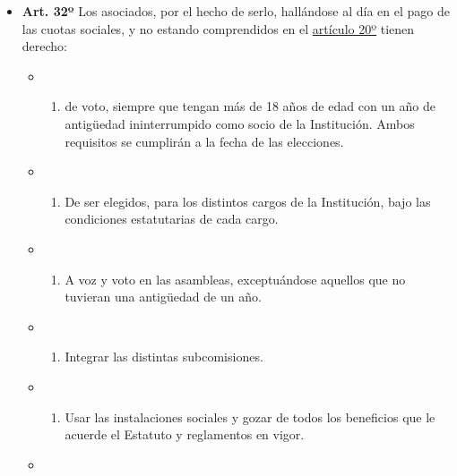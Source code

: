 \documentclass[]{book}
\providecommand{\tightlist}{%
  \setlength{\itemsep}{0pt}\setlength{\parskip}{0pt}}
\begin{document}
\begin{itemize}
\item
  \textbf{Art. 32º} Los asociados, por el hecho de serlo, hallándose al
  día en el pago de las cuotas sociales, y no estando comprendidos en el
  \protect\hyperlink{art20}{artículo 20º} tienen derecho:

  \begin{itemize}
  \item
    \begin{enumerate}
    \def\labelenumi{\alph{enumi})}
    \tightlist
    \item
      de voto, siempre que tengan más de 18 años de edad con un año de
      antigüedad ininterrumpido como socio de la Institución. Ambos
      requisitos se cumplirán a la fecha de las elecciones.
    \end{enumerate}
  \item
    \begin{enumerate}
    \def\labelenumi{\alph{enumi})}
    \setcounter{enumi}{1}
    \tightlist
    \item
      De ser elegidos, para los distintos cargos de la Institución, bajo
      las condiciones estatutarias de cada cargo.
    \end{enumerate}
  \item
    \begin{enumerate}
    \def\labelenumi{\alph{enumi})}
    \setcounter{enumi}{2}
    \tightlist
    \item
      A voz y voto en las asambleas, exceptuándose aquellos que no
      tuvieran una antigüedad de un año.
    \end{enumerate}
  \item
    \begin{enumerate}
    \def\labelenumi{\alph{enumi})}
    \setcounter{enumi}{3}
    \tightlist
    \item
      Integrar las distintas subcomisiones.
    \end{enumerate}
  \item
    \begin{enumerate}
    \def\labelenumi{\alph{enumi})}
    \setcounter{enumi}{4}
    \tightlist
    \item
      Usar las instalaciones sociales y gozar de todos los beneficios
      que le acuerde el Estatuto y reglamentos en vigor.
    \end{enumerate}
  \item
    \begin{enumerate}
    \def\labelenumi{\alph{enumi})}

\end{enumerate}
\end{itemize}
\end{itemize}
\end{document}
